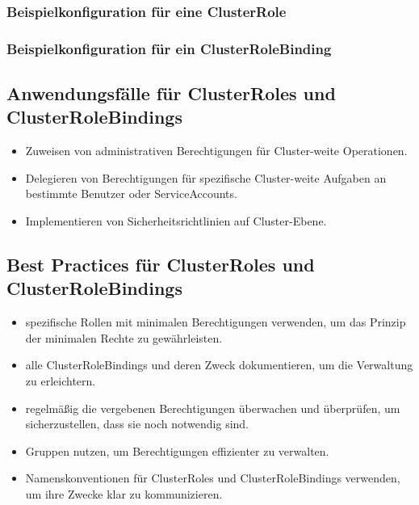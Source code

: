 \subsubsection{Beispielkonfiguration für eine ClusterRole}


\subsubsection{Beispielkonfiguration für ein ClusterRoleBinding}


\subsection{Anwendungsfälle für ClusterRoles und ClusterRoleBindings}
\begin{itemize}
    \item Zuweisen von administrativen Berechtigungen für Cluster-weite Operationen.
    \item Delegieren von Berechtigungen für spezifische Cluster-weite Aufgaben an bestimmte Benutzer oder ServiceAccounts.
    \item Implementieren von Sicherheitsrichtlinien auf Cluster-Ebene.
\end{itemize}

\subsection{Best Practices für ClusterRoles und ClusterRoleBindings}
\begin{itemize}
    \item spezifische Rollen mit minimalen Berechtigungen verwenden, um das Prinzip der minimalen Rechte zu gewährleisten.
    \item alle ClusterRoleBindings und deren Zweck dokumentieren, um die Verwaltung zu erleichtern.
    \item regelmäßig die vergebenen Berechtigungen überwachen und überprüfen, um sicherzustellen, dass sie noch notwendig sind.
    \item Gruppen nutzen, um Berechtigungen effizienter zu verwalten.
    \item Namenskonventionen für ClusterRoles und ClusterRoleBindings verwenden, um ihre Zwecke klar zu kommunizieren.
\end{itemize}

